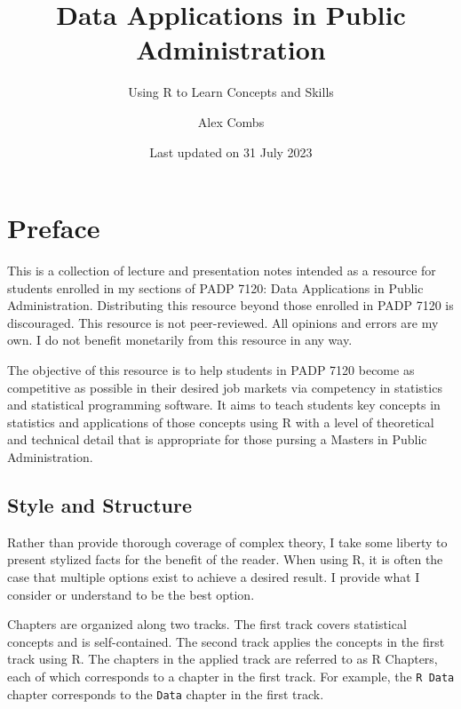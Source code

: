 \documentclass[
]{book}
\title{Data Applications in Public Administration}
\subtitle{Using R to Learn Concepts and Skills}
\author{Alex Combs}
\date{Last updated on 31 July 2023}
\begin{document}
\maketitle

\cleardoublepage\newpage
\thispagestyle{empty}

\setlength{\abovedisplayskip}{-5pt}
\setlength{\abovedisplayshortskip}{-5pt}

{
\hypersetup{linkcolor=}
\setcounter{tocdepth}{2}
\tableofcontents
}
\hypertarget{preface}{%
\chapter*{Preface}\label{preface}}


This is a collection of lecture and presentation notes intended as a resource for students enrolled in my sections of PADP 7120: Data Applications in Public Administration. Distributing this resource beyond those enrolled in PADP 7120 is discouraged. This resource is not peer-reviewed. All opinions and errors are my own. I do not benefit monetarily from this resource in any way.

The objective of this resource is to help students in PADP 7120 become as competitive as possible in their desired job markets via competency in statistics and statistical programming software. It aims to teach students key concepts in statistics and applications of those concepts using R with a level of theoretical and technical detail that is appropriate for those pursing a Masters in Public Administration.

\hypertarget{style-and-structure}{%
\section*{Style and Structure}\label{style-and-structure}}


Rather than provide thorough coverage of complex theory, I take some liberty to present stylized facts for the benefit of the reader. When using R, it is often the case that multiple options exist to achieve a desired result. I provide what I consider or understand to be the best option.

Chapters are organized along two tracks. The first track covers statistical concepts and is self-contained. The second track applies the concepts in the first track using R. The chapters in the applied track are referred to as R Chapters, each of which corresponds to a chapter in the first track. For example, the \texttt{R\ Data} chapter corresponds to the \texttt{Data} chapter in the first track.
\end{document}
